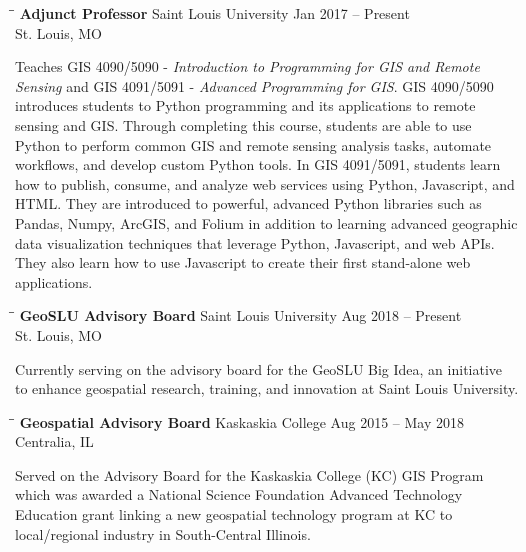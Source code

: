 \documentclass{res}
\begin{document}
\begin{resume}
   \begin{tabbing}
	\hspace{2.3in}\= \hspace{2.6in}\= \kill %
	{\bf Adjunct Professor} \>Saint Louis University     \>Jan 2017 -- Present\\
	\>St. Louis, MO
\end{tabbing}\vspace{-20pt}      %
Teaches GIS 4090/5090 - \textit{Introduction to Programming for GIS and Remote Sensing} and GIS 4091/5091 - \textit{Advanced Programming for GIS}. GIS 4090/5090 introduces students to Python programming and its applications to remote sensing and GIS. Through completing this course, students are able to use Python to perform common GIS and remote sensing analysis tasks, automate workflows, and develop custom Python tools. In GIS 4091/5091, students learn how to publish, consume, and analyze web services using Python, Javascript, and HTML. They are introduced to powerful, advanced Python libraries such as Pandas, Numpy, ArcGIS, and Folium in addition to learning advanced geographic data visualization techniques that leverage Python, Javascript, and web APIs. They also learn how to use Javascript to create their first stand-alone web applications. 



   \begin{tabbing}
	\hspace{2.3in}\= \hspace{2.6in}\= \kill %
	{\bf GeoSLU Advisory Board} \>Saint Louis University     \>Aug 2018 -- Present\\
	\>St. Louis, MO
\end{tabbing}\vspace{-20pt}      %
Currently serving on the advisory board for the GeoSLU Big Idea, an initiative to enhance geospatial research, training, and innovation at Saint Louis University.

\begin{tabbing}
	\hspace{2.3in}\= \hspace{2.6in}\= \kill %
	{\bf Geospatial Advisory Board} \>Kaskaskia College     \>Aug 2015 -- May 2018\\
	\>Centralia, IL
\end{tabbing}\vspace{-20pt}      %
Served on the Advisory Board for the Kaskaskia College (KC) GIS Program which was awarded a National Science Foundation Advanced Technology Education grant linking a new geospatial technology program at KC to local/regional industry in South-Central Illinois.
   

\end{resume}
\end{document}
